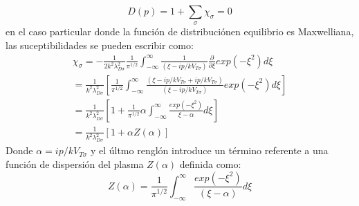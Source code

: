 \documentclass[../tesis_main_file.tex]{subfiles}
\begin{document}
\begin{equation}
D(p)=1 + \sum_{\sigma}\chi_{\sigma}=0
\end{equation}
en el caso particular donde la función de distribuciónen equilibrio es Maxwelliana, las suceptibilidades se pueden escribir como:
\begin{multline}
\chi_{\sigma} = -\frac{1}{2k^2 \lambda ^2_{D\sigma}}\frac{1}{\pi^{1/2}}\int ^{\infty}_{-\infty}\frac{1}{(\xi - ip/kV_{T\sigma})}\frac{\partial}{\partial \xi}exp(-\xi ^2)d\xi\\
= \frac{1}{k^2 \lambda ^2_{D\sigma}}\left[ \frac{1}{\pi ^{1/2}}\int ^{\infty}_{-\infty} \frac{(\xi - ip/kV_{T\sigma}+ ip/kV_{T\sigma})}{(\xi - ip/kV_{T\sigma})}exp(-\xi ^2)d\xi\right]\\
=\frac{1}{k^2 \lambda ^2_{D\sigma}}\left[1 + \frac{1}{\pi ^{1/2}}\alpha\int^{\infty}_{-\infty}\frac{exp(-\xi ^2)}{\xi -\alpha}d\xi\right]\\
= \frac{1}{k^2 \lambda ^2_{D\sigma}}\left[1+\alpha Z(\alpha)\right]
\end{multline}
Donde $\alpha = ip/kV_{T\sigma}$ y el últmo renglón introduce un término referente a una función de dispersión del plasma $Z(\alpha)$ definida como:
\begin{equation}
Z(\alpha) =\frac{1}{\pi ^{1/2}}\int^{\infty}_{-\infty}\frac{exp(-\xi ^2)}{(\xi- \alpha)}d\xi
\end{equation}
%
\end{document}
